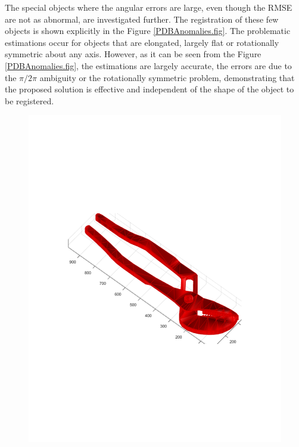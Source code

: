 \documentclass{UCF_ETD}
\begin{document}
The special objects where the angular errors are large, even though the RMSE are not as abnormal, are investigated further. The registration of these few objects is shown explicitly in the Figure \ref{PDBAnomalies.fig}. The problematic estimations occur for objects that are elongated, largely flat or rotationally symmetric about any axis. However, as it can be seen from the Figure \ref{PDBAnomalies.fig}, the estimations are largely accurate, the errors are due to  the $\pi/2\pi$ ambiguity or the rotationally symmetric problem, demonstrating that the proposed solution is effective and independent of the shape of the object to be registered. 

\begin{figure}[H] 
\begin{center}
\includegraphics[scale=0.34]{RobustRegistration/NoiselessAnomalies1}

\end{center}
\end{figure}
\end{document}
